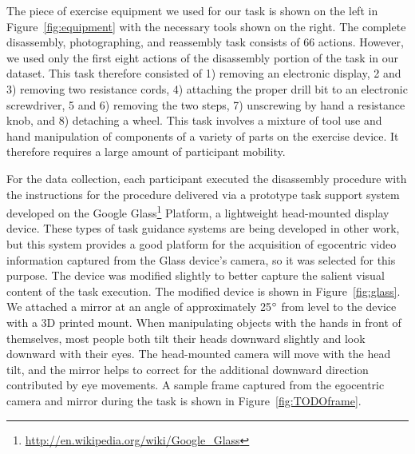 \documentclass[10pt,twocolumn,letterpaper]{article}
\begin{document}
The piece of exercise equipment we used for our task is shown on the left in Figure~\ref{fig:equipment} with the necessary tools shown on the right. The complete disassembly, photographing, and reassembly task consists of 66 actions. However, we used only the first eight actions of the disassembly portion of the task in our dataset. This task therefore consisted of 1) removing an electronic display, 2 and 3) removing two resistance cords, 4) attaching the proper drill bit to an electronic screwdriver, 5 and 6) removing the two steps, 7) unscrewing by hand a resistance knob, and 8) detaching a wheel. This task involves a mixture of tool use and hand manipulation of components of a variety of parts on the exercise device. It therefore requires a large amount of participant mobility.

For the data collection, each participant executed the disassembly procedure with the instructions for the procedure delivered via a prototype task support system developed on the Google Glass\footnote{\href{http://en.wikipedia.org/wiki/Google_Glass}{http://en.wikipedia.org/wiki/Google\_Glass}} Platform, a lightweight head-mounted display device. These types of task guidance systems are being developed in other work, but this system provides a good platform for the acquisition of egocentric video information captured from the Glass device's camera, so it was selected for this purpose. The device was modified slightly to better capture the salient visual content of the task execution. The modified device is shown in Figure~\ref{fig:glass}. We attached a mirror  at an angle of approximately 25$\degree$ from level to the device with a 3D printed mount. When manipulating objects with the hands in front of themselves, most people both tilt their heads downward slightly and look downward with their eyes. The head-mounted camera will move with the head tilt, and the mirror helps to correct for the additional downward direction contributed by eye movements. A sample frame captured from the egocentric camera and mirror during the task is shown in Figure~\ref{fig:TODOframe}.
\end{document}
